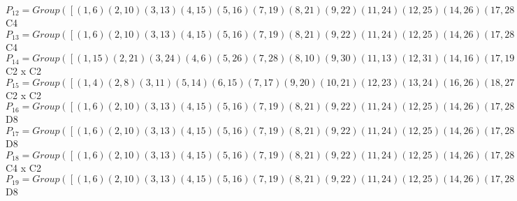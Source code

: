 \documentclass[varwidth=\maxdimen,border=10]{standalone}
\begin{document}
\begin{tabular}
$P_{12} = Group( [ ( 1, 6)( 2,10)( 3,13)( 4,15)( 5,16)( 7,19)( 8,21)( 9,22)(11,24)(12,25)(14,26)(17,28)(18,29)(20,30)(23,31)(27,32), ( 1, 5, 6,16)( 2, 9,10,22)( 3,12,13,25)( 4,14,15,26)( 7,18,19,29)( 8,20,21,30)(11,23,24,31)(17,27,28,32) ] )\cong$ C4\ \\
$P_{13} = Group( [ ( 1, 6)( 2,10)( 3,13)( 4,15)( 5,16)( 7,19)( 8,21)( 9,22)(11,24)(12,25)(14,26)(17,28)(18,29)(20,30)(23,31)(27,32), ( 1,21, 6, 8)( 2,15,10, 4)( 3,32,13,27)( 5,20,16,30)( 7,31,19,23)( 9,14,22,26)(11,18,24,29)(12,28,25,17) ] )\cong$ C4\ \\
$P_{14} = Group( [ ( 1,15)( 2,21)( 3,24)( 4, 6)( 5,26)( 7,28)( 8,10)( 9,30)(11,13)(12,31)(14,16)(17,19)(18,32)(20,22)(23,25)(27,29), ( 1, 3)( 2, 7)( 4,11)( 5,25)( 6,13)( 8,17)( 9,29)(10,19)(12,16)(14,31)(15,24)(18,22)(20,32)(21,28)(23,26)(27,30) ] )\cong$ C2 x C2\ \\
$P_{15} = Group( [ ( 1, 4)( 2, 8)( 3,11)( 5,14)( 6,15)( 7,17)( 9,20)(10,21)(12,23)(13,24)(16,26)(18,27)(19,28)(22,30)(25,31)(29,32), ( 1, 3)( 2, 7)( 4,11)( 5,25)( 6,13)( 8,17)( 9,29)(10,19)(12,16)(14,31)(15,24)(18,22)(20,32)(21,28)(23,26)(27,30) ] )\cong$ C2 x C2\ \\
$P_{16} = Group( [ ( 1, 6)( 2,10)( 3,13)( 4,15)( 5,16)( 7,19)( 8,21)( 9,22)(11,24)(12,25)(14,26)(17,28)(18,29)(20,30)(23,31)(27,32), ( 1, 5, 6,16)( 2, 9,10,22)( 3,12,13,25)( 4,14,15,26)( 7,18,19,29)( 8,20,21,30)(11,23,24,31)(17,27,28,32), ( 1, 3)( 2, 7)( 4,11)( 5,25)( 6,13)( 8,17)( 9,29)(10,19)(12,16)(14,31)(15,24)(18,22)(20,32)(21,28)(23,26)(27,30) ] )\cong$ D8\ \\
$P_{17} = Group( [ ( 1, 6)( 2,10)( 3,13)( 4,15)( 5,16)( 7,19)( 8,21)( 9,22)(11,24)(12,25)(14,26)(17,28)(18,29)(20,30)(23,31)(27,32), ( 1, 5, 6,16)( 2, 9,10,22)( 3,12,13,25)( 4,14,15,26)( 7,18,19,29)( 8,20,21,30)(11,23,24,31)(17,27,28,32), ( 1,11)( 2,17)( 3, 4)( 5,31)( 6,24)( 7, 8)( 9,32)(10,28)(12,26)(13,15)(14,25)(16,23)(18,30)(19,21)(20,29)(22,27) ] )\cong$ D8\ \\
$P_{18} = Group( [ ( 1, 6)( 2,10)( 3,13)( 4,15)( 5,16)( 7,19)( 8,21)( 9,22)(11,24)(12,25)(14,26)(17,28)(18,29)(20,30)(23,31)(27,32), ( 1, 5, 6,16)( 2, 9,10,22)( 3,12,13,25)( 4,14,15,26)( 7,18,19,29)( 8,20,21,30)(11,23,24,31)(17,27,28,32), ( 1, 4)( 2, 8)( 3,11)( 5,14)( 6,15)( 7,17)( 9,20)(10,21)(12,23)(13,24)(16,26)(18,27)(19,28)(22,30)(25,31)(29,32) ] )\cong$ C4 x C2\ \\
$P_{19} = Group( [ ( 1, 6)( 2,10)( 3,13)( 4,15)( 5,16)( 7,19)( 8,21)( 9,22)(11,24)(12,25)(14,26)(17,28)(18,29)(20,30)(23,31)(27,32), ( 1, 5, 6,16)( 2, 9,10,22)( 3,12,13,25)( 4,14,15,26)( 7,18,19,29)( 8,20,21,30)(11,23,24,31)(17,27,28,32), ( 1, 2)( 3,18)( 4,21)( 5,22)( 6,10)( 7,12)( 8,15)( 9,16)(11,32)(13,29)(14,20)(17,31)(19,25)(23,28)(24,27)(26,30) ] )\cong$ D8\ \\

\end{tabular}
\end{document}
